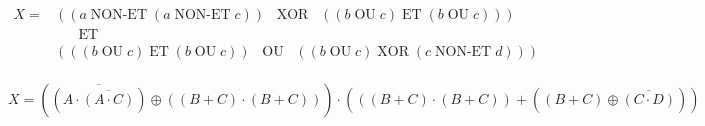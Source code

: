 \documentclass[11pt,a4paper]{article}
\begin{document}
\begin{figure}[ht!]
\end{figure}

\vspace*{-0.5cm}


\begin{equation*}
    \begin{split}
X = & ((a \; \text{NON-ET} \; (a \; \text{NON-ET} \; c)) \; \; \; \text{XOR} \; \; \; ((b \; \text{OU} \; c) \; \text{ET} \; (b \; \text{OU} \; c))) \\
    &   \; \; \; \; \; \; \text{ET} \\
    & (((b \; \text{OU} \; c) \; \text{ET} \; (b \; \text{OU} \; c)) \; \; \; \text{OU} \; \; \; ((b \; \text{OU} \; c) \; \text{XOR} \; (c \; \text{NON-ET} \; d)))\\
    \end{split}
\end{equation*}

$ X = (\overline{(A \cdot \overline{(A \cdot C)})} \oplus ((B + C) \cdot (B + C))) \cdot (((B + C) \cdot (B + C)) + ((B + C) \oplus \overline{(C \cdot D)})) $

\clearpage
\end{document}
